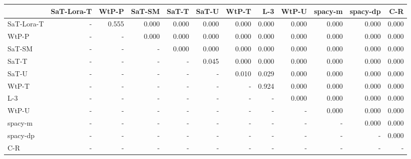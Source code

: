 \begin{tabular}{lrrrrrrrrrrr}
\toprule
 & SaT-Lora-T & WtP-P & SaT-SM & SaT-T & SaT-U & WtP-T & L-3 & WtP-U & spacy-m & spacy-dp & C-R \\
\midrule
SaT-Lora-T & - & 0.555 & 0.000 & 0.000 & 0.000 & 0.000 & 0.000 & 0.000 & 0.000 & 0.000 & 0.000 \\
WtP-P & - & - & 0.000 & 0.000 & 0.000 & 0.000 & 0.000 & 0.000 & 0.000 & 0.000 & 0.000 \\
SaT-SM & - & - & - & 0.000 & 0.000 & 0.000 & 0.000 & 0.000 & 0.000 & 0.000 & 0.000 \\
SaT-T & - & - & - & - & 0.045 & 0.000 & 0.000 & 0.000 & 0.000 & 0.000 & 0.000 \\
SaT-U & - & - & - & - & - & 0.010 & 0.029 & 0.000 & 0.000 & 0.000 & 0.000 \\
WtP-T & - & - & - & - & - & - & 0.924 & 0.000 & 0.000 & 0.000 & 0.000 \\
L-3 & - & - & - & - & - & - & - & 0.000 & 0.000 & 0.000 & 0.000 \\
WtP-U & - & - & - & - & - & - & - & - & 0.000 & 0.000 & 0.000 \\
spacy-m & - & - & - & - & - & - & - & - & - & 0.000 & 0.000 \\
spacy-dp & - & - & - & - & - & - & - & - & - & - & 0.000 \\
C-R & - & - & - & - & - & - & - & - & - & - & - \\
\bottomrule
\end{tabular}

